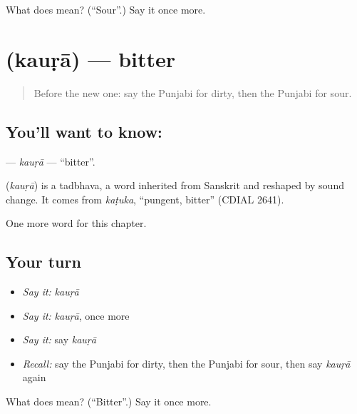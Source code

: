 \begin{tcolorbox}[breakable,colback=teal!4,colframe=teal!35!black,title={Before you move on}]
What does  mean? (\textquotedblleft{}Sour\textquotedblright{}.) Say it once more.
\end{tcolorbox}
\section[\texorpdfstring{\pa{ਕੌੜਾ} (kauṛā)}{ਕੌੜਾ (kauṛā)}]{ (kauṛā) — bitter}

\label{lesson:PA-C143-kaura}



\begin{quote}
Before the new one: say the Punjabi for dirty, then the Punjabi for sour.
\end{quote}

\subsection*{You'll want to know: }
\textbf{} — \emph{kauṛā} — \textquotedblleft{}bitter\textquotedblright{}.

\begin{cousinweb}
\textbf{} (\emph{kauṛā}) is a tadbhava, a word inherited from Sanskrit and reshaped by sound change. It comes from \emph{kaṭuka}, \textquotedblleft{}pungent, bitter\textquotedblright{} (CDIAL 2641).
\end{cousinweb}

\begin{grammarlens}[title={What you've built}]
One more word for this chapter.
\end{grammarlens}

\subsection*{Your turn}
\begin{itemize}
\raggedright
  \item \emph{Say it:} \emph{kauṛā}
  \item \emph{Say it:} \emph{kauṛā}, once more
  \item \emph{Say it:} say \emph{kauṛā}
  \item \emph{Recall:} say the Punjabi for dirty, then the Punjabi for sour, then say \emph{kauṛā} again
\end{itemize}

\begin{tcolorbox}[breakable,colback=teal!4,colframe=teal!35!black,title={Before you move on}]
What does  mean? (\textquotedblleft{}Bitter\textquotedblright{}.) Say it once more.
\end{tcolorbox}
